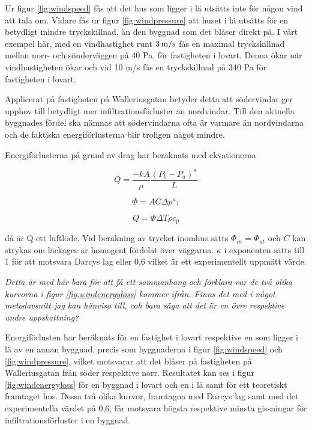 Ur figur \ref{fig:windspeed} fås att det hus som ligger i lä utsätts inte för någon vind att tala om.
 Vidare fås ur figur \ref{fig:windpressure} att huset i lä utsätts för en betydligt mindre 
 tryckskillnad, än den byggnad som det blåser direkt på. I vårt exempel här, med en 
 vindhastighet runt $\unit[3]{m/s}$ fås en maximal tryckskillnad mellan norr- och sönderväggen 
 på 40 Pa, för fastigheten i lovart. Denna ökar när vindhastigheten ökar och vid 10 m/s fås en 
 tryckskillnad på 340 Pa för fastigheten i lovart. 

Applicerat på fastigheten på Walleriusgatan betyder detta att södervindar ger upphov till 
betydligt mer infiltrationsförluster än nordvindar. Till den aktuella byggnades fördel ska nämnas 
att södervindarna ofta är varmare än nordvindarna och de faktiska energiförlusterna blir 
troligen något mindre.


Energiförlusterna på grund av drag har beräknats med ekvationerna 

\begin{equation}
Q=\frac{-kA}{\mu} \frac{(P_b - P_a)^\kappa}{L} 
\end{equation}

\begin{equation}
\Phi = AC\Delta p^\kappa;
\end{equation}

\begin{equation}
Q = \Phi\Delta T \rho c_p
\end{equation}

då är Q ett luftlöde. Vid beräkning av trycket inomhus sätts $\Phi_{in} = \Phi_{ut}$ och $C$ kan strykas om läckages är homogent fördelat över väggarna. $\kappa$ i exponenten sätts till 1 för att motsvara Darcys lag eller 0,6 vilket är ett experimentellt uppmätt värde.

\emph{\color{red} Detta är med här bara för att få ett sammanhang och förklara var de två olika kurvorna i figur \ref{fig:windenergyloss} kommer ifrån. Finns det med i något metodavsnitt jag kan hänvisa till, coh bara säga att det är en övre respektive undre uppskattning?}
 
 Energiförlusten har beräknats
  för en fastighet i lovart respektive en som ligger i lä av en annan byggnad, precis som 
  byggnaderna i figur \ref{fig:windspeed} och \ref{fig:windpressure}, vilket motsvarar att det 
  blåser på fastigheten på Walleriusgatan från söder respektive norr. Resultatet kan ses i figur 
  \ref{fig:windenergyloss} för en byggnad i lovart och en i lä samt för ett teoretiskt framtaget hus. Dessa två olika kurvor, framtagna med Darcys lag samt med det experimentella värdet på 
  0,6, får motsvara högsta respektive minsta gissningar för infiltrationsförluster i en byggnad. 

